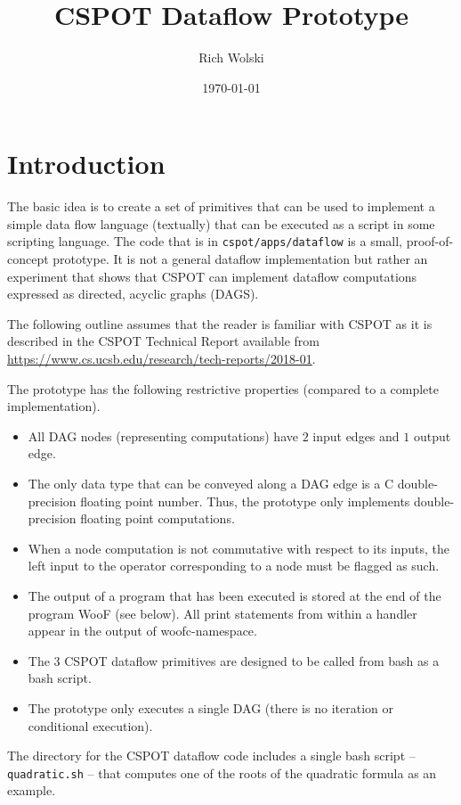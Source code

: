 \documentclass[10pt]{article}
\title{CSPOT Dataflow Prototype}
\author{Rich Wolski}
\date{\today}
\begin{document}
\maketitle

\section{Introduction}

The basic idea is to create a set of primitives that can be used to implement
a simple data flow language (textually) that can be executed as a script in
some scripting language.  The code that is in \verb+cspot/apps/dataflow+ is a
small, proof-of-concept prototype.  It is not a general dataflow
implementation but rather an experiment that shows that CSPOT can implement
dataflow computations expressed as directed, acyclic graphs (DAGS).

The following outline assumes that the reader is familiar with CSPOT as it is
described in the CSPOT Technical Report available from
\url{https://www.cs.ucsb.edu/research/tech-reports/2018-01}.

The prototype has the following restrictive properties (compared to a complete
implementation).
\begin{itemize}
\item All DAG nodes (representing computations) have $2$ input edges and $1$
output edge.
\item The only data type that can be conveyed along a DAG edge is a C
double-precision floating point number.  Thus, the prototype only implements
double-precision floating point computations.
\item When a node computation is not commutative with respect to its inputs,
the left input to the operator corresponding to a node must be flagged as
such.
\item The output of a program that has been executed is stored at the end of
the program WooF (see below).  All print statements from within a handler
appear in the output of woofc-namespace. 
\item The $3$ CSPOT dataflow primitives are designed to be called from bash as
a bash script.
\item The prototype only executes a single DAG (there is no iteration or
conditional execution).
\end{itemize}
The directory for the CSPOT dataflow code includes a single bash script --
\verb+quadratic.sh+ -- that computes one of the roots of the quadratic
formula as an example.
\end{document}
